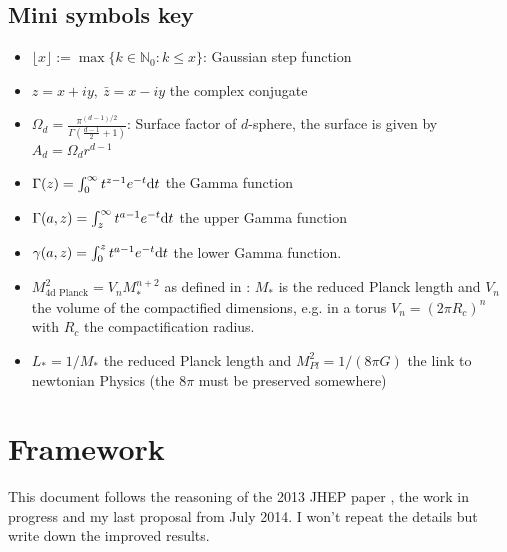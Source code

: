 \documentclass[10pt,a4paper]{article}
\begin{document}
\subsection*{Mini symbols key}
\begin{itemize}
\item $\lfloor x \rfloor :=\max \{k\in\mathbb{N}_0 : k\leq x\}$: Gaussian step function
\item $z=x + iy,~ \bar z = x - iy$ the complex conjugate
\item $\Omega_d = \frac{\pi^{(d-1)/2}}{\Gamma\left( \frac{d-1}{2} + 1\right)}$: Surface factor of $d$-sphere, the surface
   is given by $A_d = \Omega_d r^{d-1}$%
\item $\Gamma(z) = \int_0^\infty t^{z-1} e^{-t} \mathrm{d} t$ the Gamma function
\item $\Gamma(a,z) = \int_z^\infty t^{a-1} e^{-t} \mathrm{d} t$ the upper Gamma function
\item $\gamma(a,z) = \int_0^z t^{a-1} e^{-t} \mathrm{d} t$ the lower Gamma function.
\item $M^2_{\text{4d Planck}} = V_n M_*^{n+2}$ as defined in \cite{Rizzo}: $M_*$ is the reduced Planck length and $V_n$ the volume of the compactified dimensions, e.g. in a torus $V_n = (2\pi R_c)^n$ with $R_c$ the compactification radius.
\item $L_* = 1/M_*$ the reduced Planck length and $M^2_{Pl}=1/(8\pi G)$ the link to newtonian Physics (the $8\pi$ must be preserved somewhere)
\end{itemize}

\newpage

\section{Framework}
This document follows the reasoning of the 2013 JHEP paper \cite{isi2013}, the work in progress \cite{work}
and my last proposal from July 2014. I won't repeat the details but write down the improved results.
\end{document}
